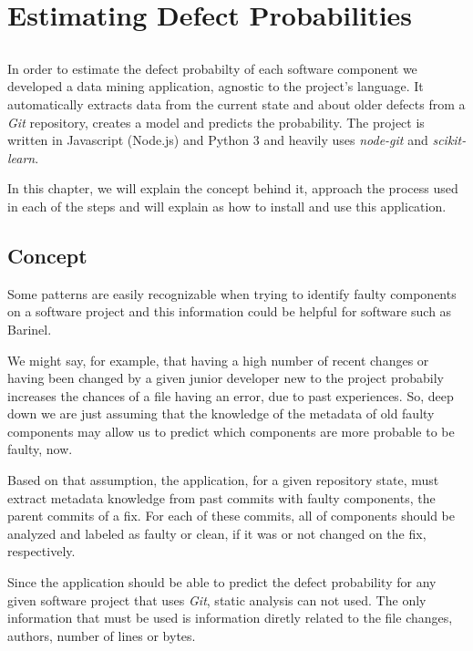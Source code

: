 \chapter{Estimating Defect Probabilities} \label{chap:estimating-dp}

\section*{}

In order to estimate the defect probabilty of each software component we developed a data mining application, agnostic to the project's language. 
It automatically extracts data from the current state and about older defects from a \emph{Git} repository, creates a model and predicts the probability. The project is written in Javascript (Node.js) and Python 3 and heavily uses \emph{node-git}
and \emph{scikit-learn}.

In this chapter, we will explain the concept behind it, approach the process used in each of the steps and will explain as how to install and use this application.

\section{Concept}

Some patterns are easily recognizable when trying to identify faulty components on a software project and this information could be helpful for software such as Barinel. 

We might say, for example, that having a high number of recent changes or having been changed by a given junior developer new to the project probabily increases the chances of a file having an error, due to past experiences. So, deep down we are just assuming that the knowledge of the metadata of old faulty components may allow us to predict which components are more probable to be faulty, now.

Based on that assumption, the application, for a given repository state, must extract metadata knowledge from past commits with faulty components, the parent commits of a fix. For each of these commits, all of components should be analyzed and labeled as faulty or clean, if it was or not changed on the fix, respectively.

Since the application should be able to predict the defect probability for any given software project that uses \emph{Git}, static analysis can not used. 
The only information that must be used is information diretly related to the file changes, authors, number of lines or bytes.

